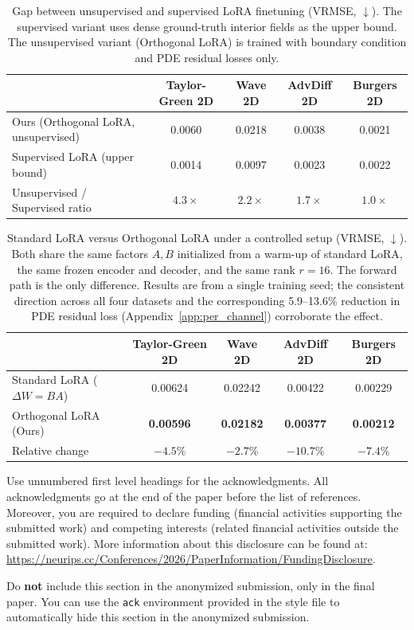\documentclass{article}
\begin{document}
\begin{table}[t]
\centering
\caption{Gap between unsupervised and supervised LoRA finetuning (VRMSE, $\downarrow$). The supervised variant uses dense ground-truth interior fields as the upper bound. The unsupervised variant (Orthogonal LoRA) is trained with boundary condition and PDE residual losses only.}
\label{tab:ablation_supervised}
\begin{tabular}{lcccc}
\toprule
& Taylor-Green 2D & Wave 2D & AdvDiff 2D & Burgers 2D \\
\midrule
Ours (Orthogonal LoRA, unsupervised) & 0.0060 & 0.0218 & 0.0038 & 0.0021 \\
Supervised LoRA (upper bound) & 0.0014 & 0.0097 & 0.0023 & 0.0022 \\
\midrule
Unsupervised / Supervised ratio & $4.3\times$ & $2.2\times$ & $1.7\times$ & $1.0\times$ \\
\bottomrule
\end{tabular}
\end{table}

\begin{table}[t]
\centering
\caption{Standard LoRA versus Orthogonal LoRA under a controlled setup (VRMSE, $\downarrow$). Both share the same factors $A,B$ initialized from a warm-up of standard LoRA, the same frozen encoder and decoder, and the same rank $r\!=\!16$. The forward path is the only difference. Results are from a single training seed; the consistent direction across all four datasets and the corresponding 5.9--13.6\% reduction in PDE residual loss (Appendix~\ref{app:per_channel}) corroborate the effect.}
\label{tab:ablation_orthlora}
\begin{tabular}{lcccc}
\toprule
& Taylor-Green 2D & Wave 2D & AdvDiff 2D & Burgers 2D \\
\midrule
Standard LoRA ($\Delta W = BA$) & 0.00624 & 0.02242 & 0.00422 & 0.00229 \\
Orthogonal LoRA (Ours) & \textbf{0.00596} & \textbf{0.02182} & \textbf{0.00377} & \textbf{0.00212} \\
\midrule
Relative change & $-4.5\%$ & $-2.7\%$ & $-10.7\%$ & $-7.4\%$ \\
\bottomrule
\end{tabular}
\end{table}


\begin{ack}
Use unnumbered first level headings for the acknowledgments. All acknowledgments
go at the end of the paper before the list of references. Moreover, you are required to declare
funding (financial activities supporting the submitted work) and competing interests (related financial activities outside the submitted work).
More information about this disclosure can be found at: \url{https://neurips.cc/Conferences/2026/PaperInformation/FundingDisclosure}.


Do {\bf not} include this section in the anonymized submission, only in the final paper. You can use the \texttt{ack} environment provided in the style file to automatically hide this section in the anonymized submission.
\end{ack}
\end{document}
